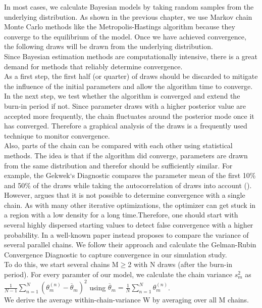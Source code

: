 In most cases, we calculate Bayesian models by taking random samples from the underlying distribution. As shown in the previous chapter, we use Markov chain Monte Carlo methods like the Metropolis-Hastings algorithm because they converge to the equilibrium of the model. Once we have achieved convergence, the following draws will be drawn from the underlying distribution. \\
Since Bayesian estimation methods are computationally intensive, there is a great demand for methods that reliably determine convergence.\\
As a first step, the first half (or quarter) of draws should be discarded to mitigate the influence of the initial parameters and allow the algorithm time to converge. In the next step, we test whether the algorithm is converged and extend the burn-in period if not.
Since parameter draws with a higher posterior value are accepted more frequently, the chain fluctuates around the posterior mode once it has converged. Therefore a graphical analysis of the draws is a frequently used technique to monitor convergence.\\
Also, parts of the chain can be compared with each other using statistical methods. The idea is that if the algorithm did converge, parameters are drawn from the same distribution and therefor should be sufficiently similar. For example, the Gekwek`s Diagnostic compares the parameter mean of the first 10\% and 50\% of the draws while taking the autocorrelation of draws into account (\cite{geweke1992}).\\
However, \cite{brooks1998} argues that it is not possible to determine convergence with a single chain. As with many other iterative optimizations, the optimizer can get stuck in a region with a low density for a long time.Therefore, one should start with several highly dispersed starting values to detect false convergence with a higher probability. In a well-known paper \cite{gelman1992} instead proposes to compare the variance of several parallel chains.
We follow their approach and calculate the Gelman-Rubin Convergence Diagnostic to capture convergence in our simulation study.\\
To do this, we start several chains M$\geq$2 with N draws (after the burn-in period).
For every paramter of our model, we calculate the chain variance $s_m^2$ as $\frac{1}{N-1}\sum_{n=1}^{N} (\theta_m^{(n)}-\overline{\theta}_m )^2$ using $\overline{\theta}_m=\frac{1}{N} \sum_{n=1}^{N} \theta_m^{(n)}$.\\
We derive the average within-chain-variance W by averaging over all M chains.\\
